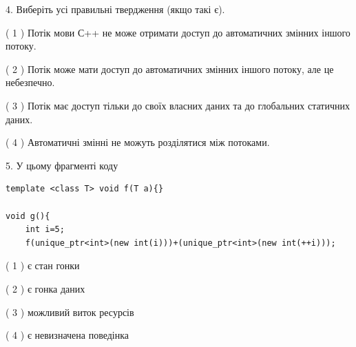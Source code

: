 \documentclass[12pt, ukrainian]{article}
\begin{document}
\begin {large}
{%
4. Виберіть усі правильні твердження (якщо такі є).\par
\vspace{2mm}

( 1 ) Потік мови С++ не може отримати доступ до автоматичних змінних іншого потоку.%

( 2 ) Потік може мати доступ до автоматичних змінних іншого потоку, але це небезпечно.%

( 3 ) Потік має доступ тільки до своїх власних даних та до глобальних статичних даних.%

( 4 ) Автоматичні змінні не можуть розділятися між потоками.%


5. У цьому фрагменті коду
\begin{verbatim}
template <class T> void f(T a){}

void g(){
    int i=5;
    f(unique_ptr<int>(new int(i)))+(unique_ptr<int>(new int(++i)));
\end{verbatim}
( 1 ) є стан гонки%

( 2 ) є гонка даних%

( 3 ) можливий виток ресурсів%

( 4 ) є невизначена поведінка%
}
\end {large}
\end{document}
